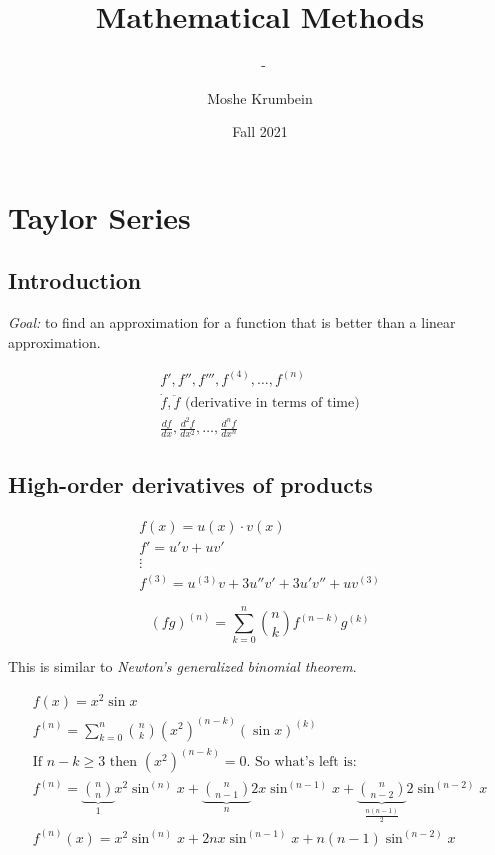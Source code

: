 \documentclass[00_complete]{subfiles}
\title{Mathematical Methods}
\author{Moshe Krumbein}
\date{Fall 2021}
\begin{document}
\setcounter{chapter}{5}

\chapter{Taylor Series}
\subtitle{\theauthor~- \thedate}

\section{Introduction}

\emph{Goal:} to find an approximation for a function that is better than a
linear approximation.

\begin{symbols}[Derivatives]
    $$
    \begin{gathered}
    f',f'',f''',f^{(4)},\dots, f^{(n)} \\
    \dot f, \ddot f \text{ (derivative in terms of time)}\\
    \frac{df}{dx}, \frac{d^2f}{dx^2}, \dots, \frac{d^nf}{dx^n}
    \end{gathered}
    $$
\end{symbols}

\section{High-order derivatives of products}

$$
\begin{gathered}
    f(x)= u(x) \cdot v(x) \\
    f'=u'v+uv' \\
    \vdots \\
    f^{(3)} = u^{(3)}v+3u''v'+3u'v''+uv^{(3)}
\end{gathered}
$$

\begin{definition}
    \[
        (fg)^{(n)} = \sum_{k=0}^{n} \binom{n}{k}f^{(n-k)}g^{(k)}
    \]
    \begin{note}
        This is similar to \emph{Newton's generalized binomial theorem}.
    \end{note}
\end{definition}

\begin{example}
    $$
    \begin{gathered}
        f(x)=x^2\sin x \\
        f^{(n)} = \sum_{k=0}^{n} \binom{n}{k}(x^2)^{(n-k)} (\sin x)^{(k)} \\
        \text{If $n-k \geq 3$ then $(x^2)^{(n-k)}=0$. So what's left is:} \\
        f^{(n)}=
        \underbrace{\binom{n}{n}}_{1} x^2\sin^{(n)}x +
        \underbrace{\binom{n}{n-1}}_{n} 2x\sin^{(n-1)}x +
        \underbrace{\binom{n}{n-2}}_{\frac{n(n-1)}{2}} 2\sin^{(n-2)}x \\
        \boxed{f^{(n)}(x) = x^2\sin^{(n)}x + 2nx\sin^{(n-1)}x +
        n(n-1)\sin^{(n-2)}x}
    \end{gathered}
    $$
\end{example}
\end{document}

